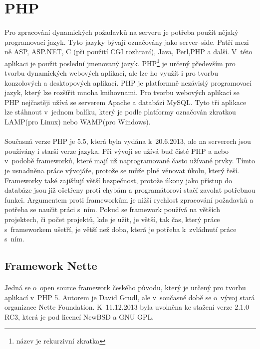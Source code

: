 \documentclass[11pt,a4paper,titlepage,oneside]{book}
\begin{document}
	\section{PHP}
		\paragraph{} Pro zpracování dynamických požadavků na serveru je potřeba použít nějaký programovací jazyk. Tyto jazyky bývají označovány jako server--side. Patří mezi ně ASP, ASP.NET, C (při použití \ac{CGI} rozhraní), Java, Perl,\acs{PHP} a další. V~této aplikaci je použit poslední jmenovaný jazyk. \ac{PHP}\footnote{název je rekurzivní zkratka} je určený především pro tvorbu dynamických webových aplikací, ale lze ho využít i pro tvorbu konzolových a desktopových aplikací. PHP je platformně nezávislý programovací jazyk, který lze rozšířit mnoha knihovnami. Pro tvorbu webových aplikací se \ac{PHP} nejčastěji užívá se serverem Apache a databází MySQL. Tyto tři aplikace lze stáhnout v~jednom balíku, který je podle platformy označován zkratkou LAMP(pro Linux) nebo WAMP(pro Windows)\cite{wiki_php}.


		\paragraph{} Současná verze PHP je 5.5, která byla vydána k~20.6.2013\cite{php_net}, ale na serverech jsou používány i starší verze jazyka. Při vývoji se užívá buď čisté PHP a nebo v~podobě frameworků, které mají už naprogramované často užívané prvky. Tímto je usnadněna práce vývojáře, protože se může plně věnovat úkolu, který řeší. Frameworky také zajišťují větší bezpečnost, protože úkony jako přístup do databáze jsou již ošetřeny proti chybám a programátorovi stačí zavolat potřebnou funkci. Argumentem proti frameworkům je nižší rychlost zpracování požadavků a potřeba se naučit práci s~ním\cite{wiki_framework}. Pokud se framework používá na větších projektech, či počet projektů, kde je užit, je větší, tak čas, který práce s~frameworkem ušetří, je větší než doba, která je potřeba k~zvládnutí práce s~ním.
		\subsection{Framework Nette}
			\paragraph{} Jedná se o~open source framework českého původu, který je určený pro tvorbu aplikací v~PHP 5.  Autorem je David Grudl, ale v~současné době se o~vývoj stará organizace Nette Foundation. K~11.12.2013 byla uvolněna ke stažení verze 2.1.0 RC3, která je pod licencí NewBSD a GNU \ac{GPL}.  
\end{document}
